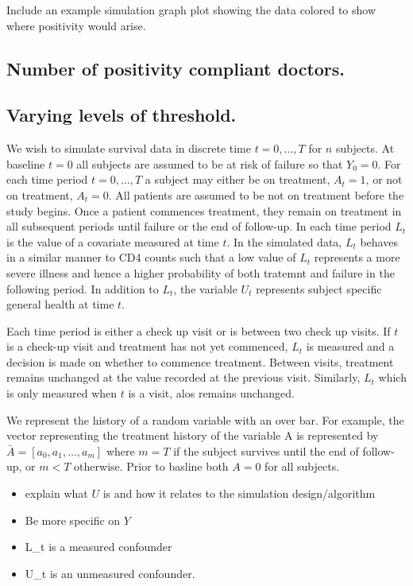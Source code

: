 \documentclass[11pt]{article}
\providecommand{\tightlist}{%
      \setlength{\itemsep}{0pt}\setlength{\parskip}{0pt}}
\begin{document}
Include an example simulation graph plot showing the data colored to
show where positivity would arise.

\subsection{Number of positivity compliant
doctors.}\label{number-of-positivity-compliant-doctors.}

\subsection{Varying levels of
threshold.}\label{varying-levels-of-threshold.}

We wish to simulate survival data in discrete time \(t = 0, \dots, T\)
for \(n\) subjects. At baseline \(t=0\) all subjects are assumed to be
at risk of failure so that \(Y_0 = 0\). For each time period
\(t = 0, \dots, T\) a subject may either be on treatment, \(A_t = 1\),
or not on treatment, \(A_t = 0\). All patients are assumed to be not on
treatment before the study begins. Once a patient commences treatment,
they remain on treatment in all subsequent periods until failure or the
end of follow-up. In each time period \(L_t\) is the value of a
covariate measured at time \(t\). In the simulated data, \(L_t\) behaves
in a similar manner to CD4 counts such that a low value of \(L_t\)
represents a more severe illness and hence a higher probability of both
tratemnt and failure in the following period. In addition to \(L_t\),
the variable \(U_t\) represents subject specific general health at time
\(t\).

Each time period is either a check up visit or is between two check up
visits. If \(t\) is a check-up visit and treatment has not yet
commenced, \(L_t\) is measured and a decision is made on whether to
commence treatment. Between visits, treatment remains unchanged at the
value recorded at the previous visit. Similarly, \(L_t\) which is only
measured when \(t\) is a visit, alos remains unchanged.

We represent the history of a random variable with an over bar. For
example, the vector representing the treatment history of the variable A
is represented by \(\bar A = [a_0, a_1, \dots, a_m]\) where \(m=T\) if
the subject survives until the end of follow-up, or \(m < T\) otherwise.
Prior to basline both \(A = 0\) for all subjects.

\begin{itemize}
\tightlist
\item
  explain what \(U\) is and how it relates to the simulation
  design/algorithm
\item
  Be more specific on \(Y\)
\item
  L\_t is a measured confounder
\item
  U\_t is an unmeasured confounder.
\end{itemize}
\end{document}
